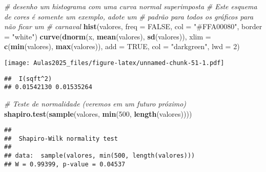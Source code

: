 \documentclass[
]{book}
\newenvironment{Shaded}{\begin{snugshade}}{\end{snugshade}}
\newcommand{\AttributeTok}[1]{\textcolor[rgb]{0.13,0.29,0.53}{#1}}
\newcommand{\CommentTok}[1]{\textcolor[rgb]{0.56,0.35,0.01}{\textit{#1}}}
\newcommand{\ConstantTok}[1]{\textcolor[rgb]{0.56,0.35,0.01}{#1}}
\newcommand{\DecValTok}[1]{\textcolor[rgb]{0.00,0.00,0.81}{#1}}
\newcommand{\FunctionTok}[1]{\textcolor[rgb]{0.13,0.29,0.53}{\textbf{#1}}}
\newcommand{\NormalTok}[1]{#1}
\newcommand{\SpecialCharTok}[1]{\textcolor[rgb]{0.81,0.36,0.00}{\textbf{#1}}}
\newcommand{\StringTok}[1]{\textcolor[rgb]{0.31,0.60,0.02}{#1}}
\begin{document}
\begin{Shaded}
\begin{Highlighting}[]
\CommentTok{\# desenho um histograma com uma curva normal superimposta}
\CommentTok{\# Este esquema de cores é somente um exemplo, adote um}
\CommentTok{\# padrão para todos os gráficos para não ficar um}
\CommentTok{\# \textquotesingle{}carnaval\textquotesingle{}}
\FunctionTok{hist}\NormalTok{(valores, }\AttributeTok{freq =} \ConstantTok{FALSE}\NormalTok{, }\AttributeTok{col =} \StringTok{"\#FFA00080"}\NormalTok{, }\AttributeTok{border =} \StringTok{"white"}\NormalTok{)}
\FunctionTok{curve}\NormalTok{(}\FunctionTok{dnorm}\NormalTok{(x, }\FunctionTok{mean}\NormalTok{(valores), }\FunctionTok{sd}\NormalTok{(valores)), }\AttributeTok{xlim =} \FunctionTok{c}\NormalTok{(}\FunctionTok{min}\NormalTok{(valores),}
    \FunctionTok{max}\NormalTok{(valores)), }\AttributeTok{add =} \ConstantTok{TRUE}\NormalTok{, }\AttributeTok{col =} \StringTok{"darkgreen"}\NormalTok{, }\AttributeTok{lwd =} \DecValTok{2}\NormalTok{)}
\end{Highlighting}
\end{Shaded}

\texttt{[image: Aulas2025\_files/figure-latex/unnamed-chunk-51-1.pdf]}

\begin{Shaded}
\end{Shaded}

\begin{verbatim}
##  I(sqft^2)            
## 0.01542130 0.01535264
\end{verbatim}

\begin{Shaded}
\begin{Highlighting}[]
\CommentTok{\# Teste de normalidade (veremos em um futuro próximo)}
\FunctionTok{shapiro.test}\NormalTok{(}\FunctionTok{sample}\NormalTok{(valores, }\FunctionTok{min}\NormalTok{(}\DecValTok{500}\NormalTok{, }\FunctionTok{length}\NormalTok{(valores))))}
\end{Highlighting}
\end{Shaded}

\begin{verbatim}
## 
##  Shapiro-Wilk normality test
## 
## data:  sample(valores, min(500, length(valores)))
## W = 0.99399, p-value = 0.04537
\end{verbatim}
\end{document}
